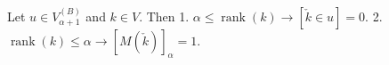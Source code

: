 Let $u \in V_{\alpha+1}^{(B)}$ and $k \in V$. Then
1. $\alpha \leq \operatorname{rank}(k) \rightarrow [\check{k} \in u] = 0.$
2. $\operatorname{rank}(k) \leq \alpha \rightarrow [M(\check{k})]_{\alpha} = 1.$
